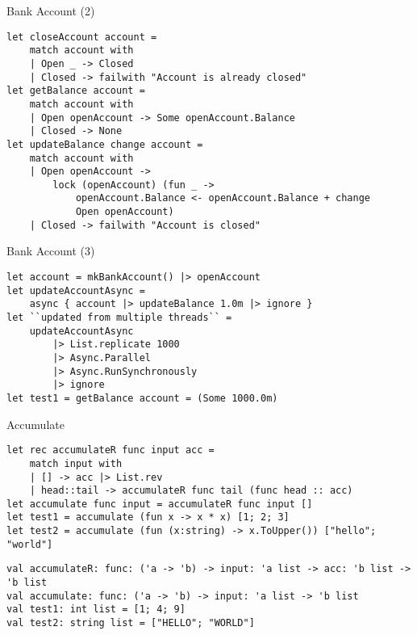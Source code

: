 \documentclass[t]{beamer}
\begin{document}
\begin{frame}[label={sec:org0052fdb},fragile]{Bank Account (2)}
 \begin{verbatim}
let closeAccount account =
    match account with
    | Open _ -> Closed
    | Closed -> failwith "Account is already closed"
let getBalance account =
    match account with
    | Open openAccount -> Some openAccount.Balance
    | Closed -> None
let updateBalance change account =
    match account with
    | Open openAccount ->
        lock (openAccount) (fun _ ->
            openAccount.Balance <- openAccount.Balance + change
            Open openAccount)
    | Closed -> failwith "Account is closed"
\end{verbatim}
\end{frame}

\begin{frame}[label={sec:org653a09d},fragile]{Bank Account (3)}
 \begin{verbatim}
let account = mkBankAccount() |> openAccount
let updateAccountAsync =        
    async { account |> updateBalance 1.0m |> ignore }
let ``updated from multiple threads`` =
    updateAccountAsync
        |> List.replicate 1000
        |> Async.Parallel 
        |> Async.RunSynchronously
        |> ignore
let test1 = getBalance account = (Some 1000.0m)
\end{verbatim}
\end{frame}

\begin{frame}[label={sec:orgd87d6f2},fragile]{Accumulate}
 \begin{verbatim}
let rec accumulateR func input acc = 
    match input with
    | [] -> acc |> List.rev
    | head::tail -> accumulateR func tail (func head :: acc)
let accumulate func input = accumulateR func input []
let test1 = accumulate (fun x -> x * x) [1; 2; 3]
let test2 = accumulate (fun (x:string) -> x.ToUpper()) ["hello"; "world"]
\end{verbatim}

\begin{verbatim}
val accumulateR: func: ('a -> 'b) -> input: 'a list -> acc: 'b list -> 'b list
val accumulate: func: ('a -> 'b) -> input: 'a list -> 'b list
val test1: int list = [1; 4; 9]
val test2: string list = ["HELLO"; "WORLD"]
\end{verbatim}
\end{frame}
\end{document}

